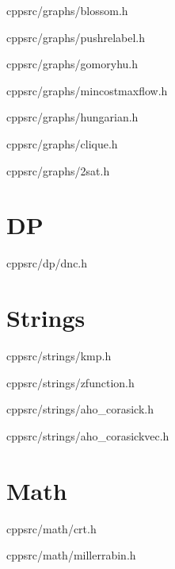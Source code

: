 \documentclass[portrait, 8pt, a4paper, oneside, twocolumn]{extarticle}
\begin{document}
    {}
    {}
    {cpp}{src/graphs/blossom.h}
    \noindent\hrulefill

    {}
    {}
    {cpp}{src/graphs/pushrelabel.h}
    \noindent\hrulefill

    {}
    {}
    {cpp}{src/graphs/gomoryhu.h}
    \noindent\hrulefill

    {}
    {}
    {cpp}{src/graphs/mincostmaxflow.h}
    \noindent\hrulefill

    {}
    {}
    {cpp}{src/graphs/hungarian.h}
    \noindent\hrulefill

    {}
    {}
    {cpp}{src/graphs/clique.h}
    \noindent\hrulefill

    {}
    {}
    {cpp}{src/graphs/2sat.h}
    \noindent\hrulefill

\section{DP}
    {}
    {}
    {cpp}{src/dp/dnc.h}
    \noindent\hrulefill

\section{Strings}

    {}
    {}
    {cpp}{src/strings/kmp.h}
    \noindent\hrulefill

    {}
    {}
    {cpp}{src/strings/zfunction.h}
    \noindent\hrulefill

    {}
    {}
    {cpp}{src/strings/aho_corasick.h}
    \noindent\hrulefill

    {}
    {}
    {cpp}{src/strings/aho_corasickvec.h}
    \noindent\hrulefill

    
\section{Math}

    {}
    {}
    {cpp}{src/math/crt.h}
    \noindent\hrulefill

    {}
    {}
    {cpp}{src/math/millerrabin.h}
    \noindent\hrulefill
\end{document}
